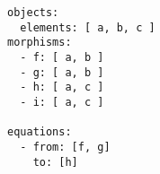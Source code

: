 \begin{verbatim}
objects:
  elements: [ a, b, c ]
morphisms:
  - f: [ a, b ]
  - g: [ a, b ]
  - h: [ a, c ]
  - i: [ a, c ]

equations:
  - from: [f, g]
    to: [h]



\end{verbatim}